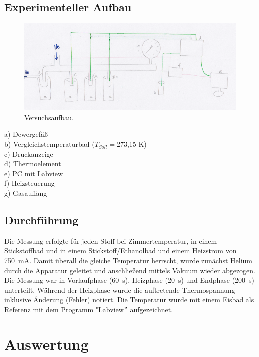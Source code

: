 \documentclass[12pt,a4paper,titlepage,headinclude,bibtotoc]{scrartcl}
\begin{document}
\subsection{Experimenteller Aufbau}

\begin{figure} [h!]
\begin{center}
\includegraphics[scale=0.9]{VersuchsaufbauZeichnung.png} \end{center}
\caption{Versuchsaufbau.}
\end{figure}

a) Dewergefäß\\
b) Vergleichstemperaturbad ($T_{Soll}=$273,15 K)\\
c) Druckanzeige\\
d) Thermoelement\\
e) PC mit Labview\\
f) Heizsteuerung\\
g) Gasauffang\\
\subsection{Durchführung}
Die Messung erfolgte für jeden Stoff bei Zimmertemperatur, in einem Stickstoffbad und in einem Stickstoff/Ethanolbad und einem Heizstrom von 750~mA. Damit überall die gleiche Temperatur herrscht, wurde zunächst Helium durch die Apparatur geleitet und anschließend mittels Vakuum wieder abgezogen. Die Messung war in Vorlaufphase (60~s), Heizphase (20~s) und Endphase (200~s) unterteilt. Während der Heizphase wurde die auftretende Thermospannung inklusive Änderung (Fehler) notiert. Die Temperatur wurde mit einem Eisbad als Referenz mit dem Programm "Labview$"$ aufgezeichnet.\\



\section{Auswertung}
\end{document}
